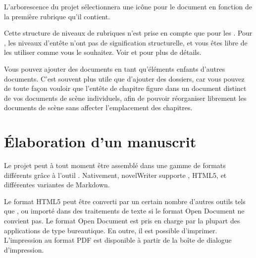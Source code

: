 \documentclass[a4paper,11pt,french]{sphinxmanual}
\begin{document}
\sphinxAtStartPar
L’arborescence du projet sélectionnera une icône pour le document en fonction de la première rubrique qu’il contient.

\sphinxAtStartPar
Cette structure de niveaux de rubriques n’est prise en compte que pour les {\hyperref[\detokenize{int_glossary:term-Novel-Documents}]{}}. Pour {\hyperref[\detokenize{int_glossary:term-Project-Notes}]{}}, les niveaux d’en\sphinxhyphen{}tête n’ont pas de signification structurelle, et vous êtes libre de les utiliser comme vous le souhaitez. Voir {\hyperref[\detokenize{project_structure:a-struct}]{}} et {\hyperref[\detokenize{project_references:a-references}]{}} pour plus de détails.

\sphinxAtStartPar
{}Vous pouvez ajouter des documents en tant qu’éléments enfants d’autres documents. C’est souvent plus utile que d’ajouter des dossiers, car vous pouvez de toute façon vouloir que l’en\sphinxhyphen{}tête de chapitre figure dans un document distinct de vos documents de scène individuels, afin de pouvoir réorganiser librement les documents de scène sans affecter l’emplacement des chapitres.


\section{Élaboration d’un manuscrit}
\label{\detokenize{usage_breakdown:building-a-manuscript}}\label{\detokenize{usage_breakdown:a-breakdown-export}}
\sphinxAtStartPar
Le projet peut à tout moment être assemblé dans une gamme de formats différents grâce à l’outil . Nativement, novelWriter supporte , HTML5, et différentes variantes de Markdown.

\sphinxAtStartPar
Le format HTML5 peut être converti par un certain nombre d’autres outils tels que , ou importé dans des traitements de texte si le format Open Document ne convient pas. Le format Open Document est pris en charge par la plupart des applications de type bureautique. En outre, il est possible d’imprimer. L’impression au format PDF est disponible à partir de la boîte de dialogue d’impression.
\end{document}
